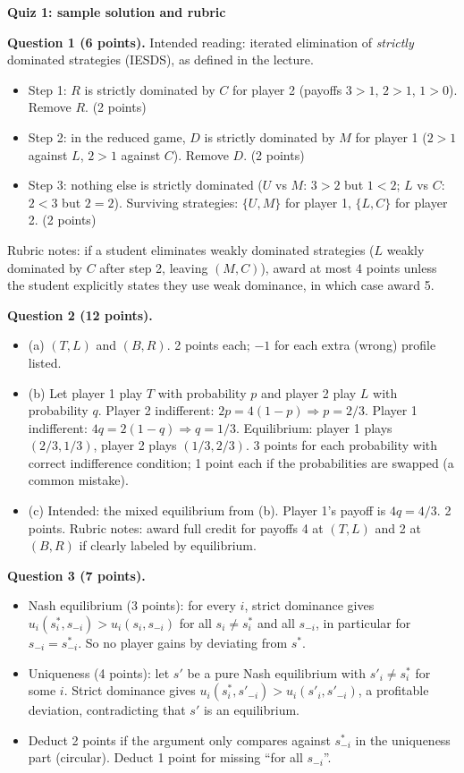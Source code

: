 \documentclass[11pt,a4paper]{article}
\begin{document}
{\Large\bfseries Quiz 1: sample solution and rubric}

\textbf{Question 1 (6 points).} Intended reading: iterated elimination of \emph{strictly} dominated strategies (IESDS), as defined in the lecture.
\begin{itemize}
  \item Step 1: $R$ is strictly dominated by $C$ for player 2 (payoffs $3>1$, $2>1$, $1>0$). Remove $R$. \hfill (2 points)
  \item Step 2: in the reduced game, $D$ is strictly dominated by $M$ for player 1 ($2>1$ against $L$, $2>1$ against $C$). Remove $D$. \hfill (2 points)
  \item Step 3: nothing else is strictly dominated ($U$ vs $M$: $3>2$ but $1<2$; $L$ vs $C$: $2<3$ but $2=2$). Surviving strategies: $\{U, M\}$ for player 1, $\{L, C\}$ for player 2. \hfill (2 points)
\end{itemize}
Rubric notes: if a student eliminates weakly dominated strategies ($L$ weakly dominated by $C$ after step 2, leaving $(M, C)$), award at most 4 points unless the student explicitly states they use weak dominance, in which case award 5.

\textbf{Question 2 (12 points).}
\begin{itemize}
  \item (a) $(T, L)$ and $(B, R)$. 2 points each; $-1$ for each extra (wrong) profile listed.
  \item (b) Let player 1 play $T$ with probability $p$ and player 2 play $L$ with probability $q$.
  Player 2 indifferent: $2p = 4(1-p) \Rightarrow p = 2/3$. Player 1 indifferent: $4q = 2(1-q) \Rightarrow q = 1/3$.
  Equilibrium: player 1 plays $(2/3, 1/3)$, player 2 plays $(1/3, 2/3)$.
  3 points for each probability with correct indifference condition; 1 point each if the probabilities are swapped (a common mistake).
  \item (c) Intended: the mixed equilibrium from (b). Player 1's payoff is $4q = 4/3$. 2 points.
  Rubric notes: award full credit for payoffs 4 at $(T,L)$ and 2 at $(B,R)$ if clearly labeled by equilibrium.
\end{itemize}

\textbf{Question 3 (7 points).}
\begin{itemize}
  \item Nash equilibrium (3 points): for every $i$, strict dominance gives $u_i(s_i^*, s_{-i}) > u_i(s_i, s_{-i})$ for all $s_i \neq s_i^*$ and all $s_{-i}$, in particular for $s_{-i} = s_{-i}^*$. So no player gains by deviating from $s^*$.
  \item Uniqueness (4 points): let $s'$ be a pure Nash equilibrium with $s'_i \neq s_i^*$ for some $i$. Strict dominance gives $u_i(s_i^*, s'_{-i}) > u_i(s'_i, s'_{-i})$, a profitable deviation, contradicting that $s'$ is an equilibrium.
  \item Deduct 2 points if the argument only compares against $s_{-i}^*$ in the uniqueness part (circular). Deduct 1 point for missing ``for all $s_{-i}$''.
\end{itemize}
\end{document}
